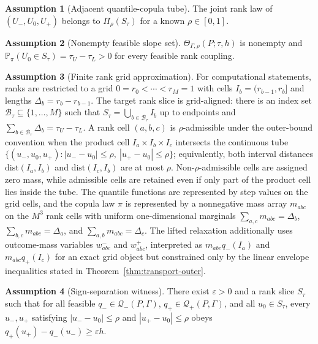 \documentclass[11pt]{article}
\renewcommand{\Pr}{\mathbb{P}}
\theoremstyle{definition}
\newtheorem{assumption}{Assumption}
\theoremstyle{plain}
\theoremstyle{remark}
\begin{document}
\begin{assumption}[Adjacent quantile-copula tube]\label{ass:copula}
The joint rank law of \((U_-,U_0,U_+)\) belongs to \(\Pi_\rho(S_\tau)\) for a known \(\rho\in[0,1]\).
\end{assumption}

\begin{assumption}[Nonempty feasible slope set]\label{ass:nonempty}
\(\Theta_{\Gamma,\rho}(P;\tau,h)\) is nonempty and \(\Pr_\pi(U_0\in S_\tau)=\tau_U-\tau_L>0\) for every feasible rank coupling.
\end{assumption}

\begin{assumption}[Finite rank grid approximation]\label{ass:grid}
For computational statements, ranks are restricted to a grid \(0=r_0<\cdots<r_M=1\) with cells \(I_b=(r_{b-1},r_b]\) and lengths \(\Delta_b=r_b-r_{b-1}\).  The target rank slice is grid-aligned: there is an index set \(\mathcal B_\tau\subseteq\{1,\ldots,M\}\) such that \(S_\tau=\bigcup_{b\in\mathcal B_\tau} I_b\) up to endpoints and \(\sum_{b\in\mathcal B_\tau}\Delta_b=\tau_U-\tau_L\).  A rank cell \((a,b,c)\) is \(\rho\)-admissible under the outer-bound convention when the product cell \(I_a\times I_b\times I_c\) intersects the continuous tube \(\{(u_-,u_0,u_+): |u_--u_0|\le\rho,\ |u_+-u_0|\le\rho\}\); equivalently, both interval distances \(\mathrm{dist}(I_a,I_b)\) and \(\mathrm{dist}(I_c,I_b)\) are at most \(\rho\).  Non-\(\rho\)-admissible cells are assigned zero mass, while admissible cells are retained even if only part of the product cell lies inside the tube.  The quantile functions are represented by step values on the grid cells, and the copula law \(\pi\) is represented by a nonnegative mass array \(m_{abc}\) on the \(M^3\) rank cells with uniform one-dimensional marginals \(\sum_{a,c}m_{abc}=\Delta_b\), \(\sum_{b,c}m_{abc}=\Delta_a\), and \(\sum_{a,b}m_{abc}=\Delta_c\).  The lifted relaxation additionally uses outcome-mass variables \(w^-_{abc}\) and \(w^+_{abc}\), interpreted as \(m_{abc}q_-(I_a)\) and \(m_{abc}q_+(I_c)\) for an exact grid object but constrained only by the linear envelope inequalities stated in Theorem~\ref{thm:transport-outer}.
\end{assumption}

\begin{assumption}[Sign-separation witness]\label{ass:sign-witness}
There exist \(\varepsilon>0\) and a rank slice \(S_\tau\) such that for all feasible \(q_-\in\mathcal Q_-(P,\Gamma)\), \(q_+\in\mathcal Q_+(P,\Gamma)\), and all \(u_0\in S_\tau\), every \(u_-,u_+\) satisfying \(|u_--u_0|\le\rho\) and \(|u_+-u_0|\le\rho\) obeys \(q_+(u_+)-q_-(u_-)\ge\varepsilon h\).
\end{assumption}
\end{document}
